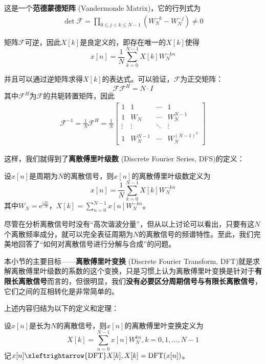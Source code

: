 这是一个\textbf{范德蒙德矩阵} (Vandermonde Matrix)，它的行列式为
\begin{align*}
    \det\mathcal{F}=\prod_{0\leq j<k\leq N-1}(W_N^{-k}-W_N^{-j})\neq 0
\end{align*}

矩阵$\mathcal{F}$可逆，因此$X[k]$是良定义的，即存在唯一的$X[k]$使得
\[x[n]=\frac{1}{N}\sum_{k=0}^{N-1}X[k]W_N^{-kn}\]

并且可以通过逆矩阵求得$X[k]$的表达式。可以验证，$\mathcal{F} $为正交矩阵：
$$\mathcal{F} \mathcal{F} ^H=N\cdot I$$
其中$\mathcal{F} ^H$为$\mathcal{F} $的共轭转置矩阵，因此
\begin{align*}
    \mathcal{F} ^{-1}=\frac{1}{N}\mathcal{F}^H=\frac{1}{N}\begin{bmatrix}1 & 1 & \cdots & 1 \\
    1 & W_N & \cdots & W_N^{N-1} \\
    \vdots & \vdots & \ddots & \vdots \\
    1 & W_N^{N-1} & \cdots & W_N^{(N-1)^2}
    \end{bmatrix}
\end{align*}

这样，我们就得到了\textbf{离散傅里叶级数} (Discrete Fourier Series, DFS)的定义：
\begin{definition}[离散傅里叶级数]
    设$x[n]$是周期为$N$的离散信号，则$x[n]$的离散傅里叶级数定义为
    \[x[n]=\frac{1}{N}\sum_{k=0}^{N-1}X[k]W_N^{-kn}\]
    其中$W_N=\mathrm{e}^{\mathrm{i}\frac{2\pi}{N}}$，$X[k]=\sum_{n=0}^{N-1}x[n]W_N^{-kn}$。
\end{definition}

尽管在分析离散信号时没有“高次谐波分量”，但从以上讨论可以看出，只要有这$N$个离散频率成分，就可以完全表征周期为$N$的离散信号的频谱特性。至此，我们完美地回答了“如何对离散信号进行分解与合成”的问题。

本小节的主要目标——\textbf{离散傅里叶变换} (Discrete Fourier Transform, DFT)就是求解离散傅里叶级数的系数的这个变换，只是习惯上认为离散傅里叶变换是针对于\textbf{有限长离散信号}而言的\cite{dsp}，但很明显，我们\textbf{没有必要区分周期信号与有限长离散信号}，它们之间的互相转化是非常简单的。

上述内容归结为以下的定义和定理：

\begin{definition}[离散傅里叶变换]
    设$x[n]$是长为$N$的离散信号，则$x[n]$的离散傅里叶变换定义为
    \[X[k]=\sum_{n=0}^{N-1}x[n]W_N^{kn},k=0,1,\dots,N-1\]
    记$x[n]\xleftrightarrow{\mathrm{DFT}}X[k],X[k]=\mathrm{DFT}(x[n])$。
\end{definition}

